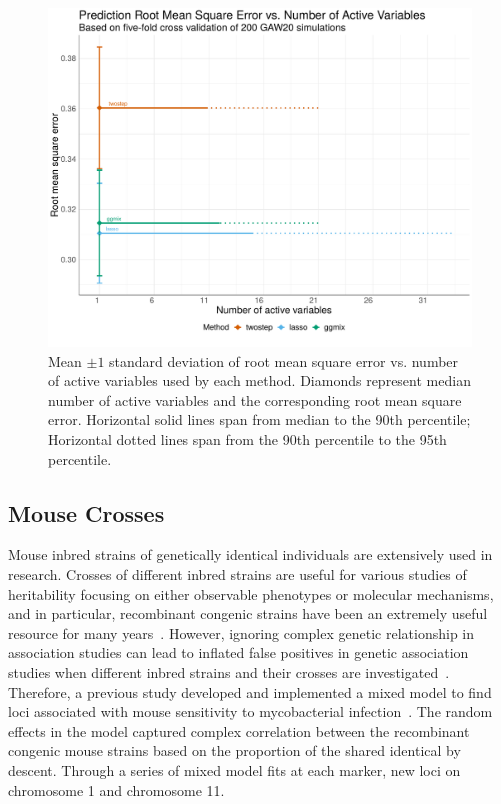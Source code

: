 \documentclass[12pt,letter]{article}\usepackage[]{graphicx}\usepackage[]{color}
\newenvironment{knitrout}{}{} %
\begin{document}
\begin{knitrout}\scriptsize
{}\color{fgcolor}\begin{figure}[H]

{\centering \includegraphics[width=1\linewidth]{figure/GAW20-prediction-RMSE-activeVariable-1} 

}

\caption[Mean $\pm 1$ standard deviation of root mean square error vs]{Mean $\pm 1$ standard deviation of root mean square error vs. number of active variables used by each method. Diamonds represent median number of active variables and the corresponding root mean square error. Horizontal solid lines span from median to the 90th percentile; Horizontal dotted lines span from the 90th percentile to the 95th percentile.}\label{fig:GAW20-prediction-RMSE-activeVariable}
\end{figure}


\end{knitrout}

\subsection{Mouse Crosses}

Mouse inbred strains of genetically identical individuals are extensively used in research.
Crosses of different inbred strains are useful for various studies of heritability focusing on either observable phenotypes or molecular mechanisms, and in particular, recombinant congenic strains have been an extremely useful resource for many years~\citep{fortin2001recombinant}.
However, ignoring complex genetic relationship in association studies can lead to inflated false positives in genetic association studies when different inbred strains and their crosses are investigated~\citep{bennett2010high,flint2012genome,cheng2010genome}.
Therefore, a previous study developed and implemented a mixed model to find loci associated with mouse sensitivity to mycobacterial infection~\citep{di2010strain}. The random effects in the model captured complex correlation between the recombinant congenic mouse strains based on the proportion of the shared identical by descent. Through a series of mixed model fits at each marker, new loci on chromosome 1 and chromosome 11.
\end{document}

